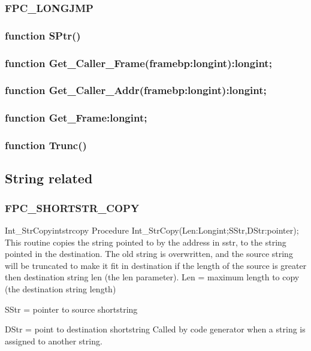 \documentclass [a4paper,12pt]{article}
\begin{document}
\subsubsection{FPC{\_}LONGJMP}
\label{subsubsec:mylabel31}

\subsubsection{function SPtr()}
\label{subsubsec:function}

\subsubsection{function Get{\_}Caller{\_}Frame(framebp:longint):longint;}
\label{subsubsec:mylabel32}

\subsubsection{function Get{\_}Caller{\_}Addr(framebp:longint):longint;}
\label{subsubsec:mylabel33}

\subsubsection{function Get{\_}Frame:longint;}
\label{subsubsec:mylabel34}

\subsubsection{function Trunc()}
\label{subsubsec:mylabel35}

\subsection{String related}
\label{subsec:string}

\subsubsection{FPC{\_}SHORTSTR{\_}COPY}
\label{subsubsec:mylabel36}

\begin{procedurel}{Int{\_}StrCopy}{intstrcopy}
\Declaration
Procedure Int{\_}StrCopy(Len:Longint;SStr,DStr:pointer);
\Description
This routine copies the string pointed to by the address in sstr, to the
string pointed in the destination. The old string is overwritten, and the
source string will be truncated to make it fit in destination if the length
of the source is greater then destination string len (the len parameter).
\Parameters
Len = maximum length to copy (the destination string length) \par
SStr = pointer to source shortstring \par
DStr = point to destination shortstring
\Notes
Called by code generator when a string is assigned to another string.
\end{procedurel}
\end{document}
